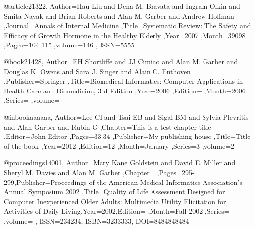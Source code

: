 @article{21322, Author={Hau Liu and Dena M. Bravata and Ingram Olkin and Smita Nayak and Brian Roberts and Alan M. Garber and Andrew Hoffman },Journal={Annals of Internal Medicine },Title={Systematic Review: The Safety and Efficacy of Growth Hormone in the Healthy Elderly },Year={2007 },Month={39098 },Pages={104-115 },volume={146 }, ISSN={5555} }

@book{21428, Author={EH Shortliffe and JJ Cimino and Alan M. Garber and Douglas K. Owens and Sara J. Singer and Alain C. Enthoven },Publisher={Springer },Title={Biomedical Informatics: Computer Applications in Health Care and Biomedicine, 3rd Edition },Year={2006 },Edition={ },Month={2006 },Series={ },volume={ } }				

@inbook{aaaaaa, Author={Lee CI and Tsai EB and Sigal BM and Sylvia Plevritis and Alan Garber and Rubin G },Chapter={This is a test chapter title },Editor={John Editor },Pages={33-34 },Publisher={My publishing house },Title={Title of the book },Year={2012 },Edition={12 },Month={January },Series={3 },volume={2 } }				

@proceedings{14001, Author={Mary Kane Goldstein and David E. Miller and Sheryl M. Davies and Alan M. Garber },Chapter={ },Pages={295-299},Publisher={Proceedings of the American Medical Informatics Association's Annual Symposium 2002 },Title={Quality of Life Assessment Designed for Computer Inexperienced Older Adults: Multimedia Utility Elicitation for Activities of Daily Living},Year={2002},Edition={ },Month={Fall 2002 },Series={ },volume={ }, ISSN={234234}, ISBN={3233333}, DOI={8484848484} }

